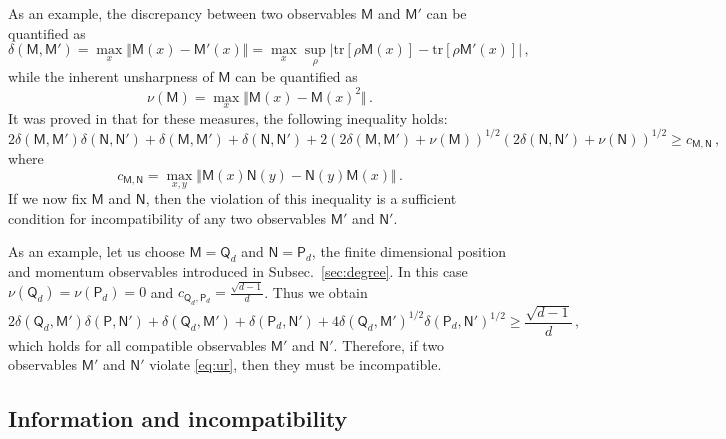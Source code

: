 \documentclass[12pt]{iopart}
\theoremstyle{definition}
\newcommand{\Mo}{\mathsf{M}}%
\newcommand{\No}{\mathsf{N}}%
\newcommand{\Po}{\mathsf{P}}%
\newcommand{\Qo}{\mathsf{Q}}%
\begin{document}
As an example, the discrepancy between two observables $\Mo$ and $\Mo'$ can be quantified as
\begin{equation}
\delta(\Mo, \Mo') 
= \max_x \Vert \Mo(x) -\Mo'(x)\Vert 
= \max_x \sup_{\rho} \left| \mbox{tr}[\rho\Mo(x)] 
- \mbox{tr}[\rho \Mo'(x)]\right| \, , 
\end{equation}
while the inherent unsharpness of $\Mo$ can be quantified as
\begin{equation}
\nu(\Mo)=\max_x \Vert \Mo(x) -\Mo(x)^2\Vert \, .
\end{equation}
It was proved in \cite{MiIm08} that for these measures, the following inequality holds:
\begin{equation*}
2 \delta(\Mo, \Mo') 
\delta(\No, \No') + 
\delta(\Mo, \Mo') + \delta(\No, \No') 
+2 (2 \delta(\Mo, \Mo') + 
\nu(\Mo))^{1/2} 
(2 \delta(\No, \No') + \nu(\No))^{1/2} 
\geq c_{\Mo,\No} \, ,  
\end{equation*}
where 
\begin{equation}
c_{\Mo,\No} =  \max_{x,y} \Vert  \Mo(x)\No(y) - \No(y)\Mo(x) \Vert \, . 
\end{equation}
If we now fix $\Mo$ and $\No$, then the violation of this inequality is a sufficient condition for incompatibility of any two observables $\Mo'$ and $\No'$.

As an example, let us choose $\Mo=\Qo_d$ and $\No=\Po_d$, the finite dimensional position and momentum observables introduced in Subsec.~\ref{sec:degree}.
In this case $\nu(\Qo_d) = \nu(\Po_d)=0$ and $c_{\Qo_d,\Po_d} = \frac{\sqrt{d-1}}{d}$.
Thus we obtain 
\begin{equation}\label{eq:ur}
2 \delta(\Qo_d, \Mo') 
\delta(\Po, \No') + 
\delta(\Qo_d, \Mo') + \delta(\Po_d, \No') 
+4 \delta(\Qo_d, \Mo')^{1/2}  
\delta(\Po_d, \No')^{1/2}  
\geq \frac{\sqrt{d-1}}{d} \, , 
\end{equation} 
which holds for all compatible observables $\Mo'$ and $\No'$. 
Therefore, if two observables  $\Mo'$ and $\No'$ violate \eqref{eq:ur}, then they must be incompatible. 

\subsection{Information and incompatibility}\label{sec:ic}
\end{document}
